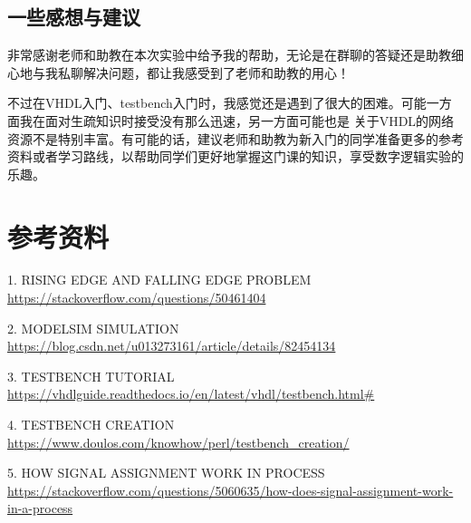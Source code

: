 \documentclass[UTF8]{article}
\begin{document}
\subsection{一些感想与建议}
\qquad 非常感谢老师和助教在本次实验中给予我的帮助，无论是在群聊的答疑还是助教细心地与我私聊解决问题，都让我感受到了老师和助教的用心！

\qquad 不过在VHDL入门、testbench入门时，我感觉还是遇到了很大的困难。可能一方面我在面对生疏知识时接受没有那么迅速，另一方面可能也是
关于VHDL的网络资源不是特别丰富。有可能的话，建议老师和助教为新入门的同学准备更多的参考资料或者学习路线，以帮助同学们更好地掌握这门课的知识，享受数字逻辑实验的乐趣。



\section{参考资料}
1. RISING EDGE AND FALLING EDGE PROBLEM \\\url{https://stackoverflow.com/questions/50461404}


2. MODELSIM SIMULATION \\\url{https://blog.csdn.net/u013273161/article/details/82454134}


3. TESTBENCH TUTORIAL \\\url{https://vhdlguide.readthedocs.io/en/latest/vhdl/testbench.html#}


4. TESTBENCH CREATION \\\url{https://www.doulos.com/knowhow/perl/testbench_creation/}


5. HOW SIGNAL ASSIGNMENT WORK IN PROCESS \\\url{https://stackoverflow.com/questions/5060635/how-does-signal-assignment-work-in-a-process}




\end{document}
